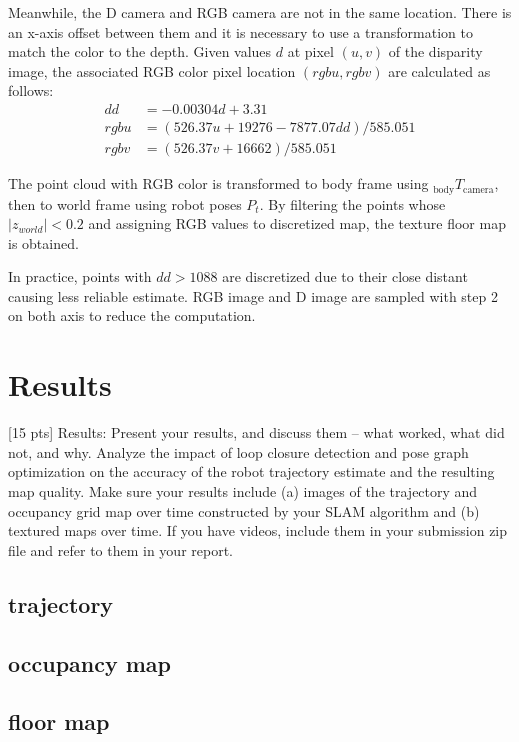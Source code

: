 \documentclass[conference]{IEEEtran}
\begin{document}
Meanwhile, the D camera and RGB camera are not in the same location. 
There is an x-axis offset between them and it is necessary to use a 
transformation to match the color to the depth. 
Given values $d$ at pixel $(u, v)$ of the disparity image, 
the associated RGB color pixel location $(rgbu, rgbv)$ are calculated as follows:
$$
\begin{aligned}
    dd&=-0.00304d+3.31\\ 
    rgbu&=\left( 526.37u+19276-7877.07dd\right)  /585.051\\ 
    rgbv&=\left( 526.37v+16662\right)  /585.051
\end{aligned} 
$$

The point cloud with RGB color is 
transformed to body frame using $_{\text{body}}T_{\text{camera}}$,
then to world frame using robot poses $P_t$.
By filtering the points whose $|z_{world}| < 0.2$ and assigning RGB values to 
discretized map, the texture floor map is obtained.

In practice, points with $dd > 1088$ are discretized due to their close distant causing less reliable estimate.
RGB image and D image are sampled with step 2 on both axis to reduce the computation.

\section{Results}
[15 pts] Results: Present your results, and discuss them – what worked, what did not, and why.
Analyze the impact of loop closure detection and pose graph optimization on the accuracy of the robot
trajectory estimate and the resulting map quality. Make sure your results include (a) images of the
trajectory and occupancy grid map over time constructed by your SLAM algorithm and (b) textured
maps over time. If you have videos, include them in your submission zip file and refer to them in your
report.
\subsection{trajectory}

\subsection{occupancy map}

\subsection{floor map}
\end{document}
